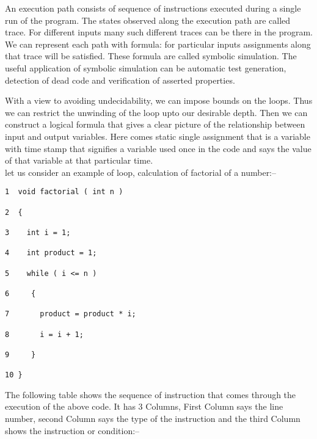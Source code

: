 An execution path consists of sequence of instructions executed during a single 
run of the program. The states observed along the execution path are called 
trace. For different inputs many such different traces can be there in the 
program. We can represent each path with formula: for particular inputs 
assignments along that trace will be satisfied. These formula are called 
symbolic simulation. The useful application of symbolic simulation can be
automatic test generation, detection of dead code and verification of asserted
 properties.

With a view to avoiding undecidability, we can impose bounds on the loops. Thus 
we can restrict the unwinding of the loop upto our desirable depth. Then we can
construct a logical formula that gives a clear picture of the relationship 
between input and output variables. Here comes static single assignment that is
a variable with time stamp that signifies a variable used once in the code
and says the value of that variable at that particular time.\\

let us consider an example of loop, calculation of factorial of a number:--

\begin{verbatim}
1  void factorial ( int n )

2  {

3    int i = 1;

4    int product = 1;

5    while ( i <= n )

6     {

7       product = product * i;

8       i = i + 1;

9     }

10 }

\end{verbatim}

The following table shows the sequence of instruction that comes through the
execution of the above code. It has 3 Columns, First Column says the line 
number, second Column says the type of the instruction and the third Column
shows the instruction or condition:--

